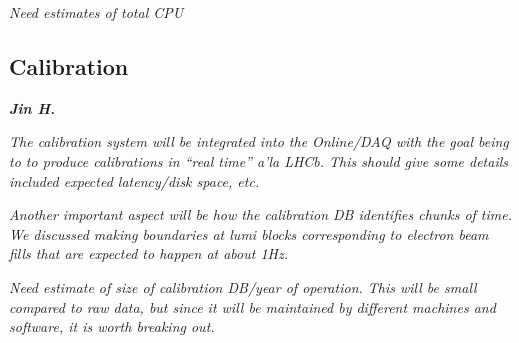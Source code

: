 

\emph{Need estimates of total CPU}

\subsection{Calibration}

\textbf{\emph{Jin H.}}

\emph{The calibration system will be integrated into the Online/DAQ with the goal being to to produce calibrations in ``real time'' a'la LHCb. This should give some details included expected latency/disk space, etc.}

\emph{Another important aspect will be how the calibration DB identifies chunks of time. We discussed making boundaries at lumi blocks corresponding to electron beam fills that are expected to happen at about 1Hz.}

\emph{Need estimate of size of calibration DB/year of operation. This will be small compared to raw data, but since it will be maintained by different machines and software, it is worth breaking out.}






